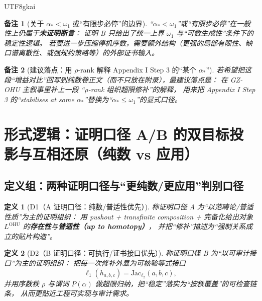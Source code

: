 \documentclass[12pt]{article}
\newtheorem{definition}{定义}[section]
\newtheorem{remark}{备注}[section]
\begin{document}
\begin{CJK*}{UTF8}{gkai}
\begin{remark}[关于 $\alpha_\ast<\omega_1$ 或“有限步必停”的边界]
“$\alpha_\ast<\omega_1$”或“有限步必停”在一般性上仍属于\textbf{未证明断言}：
证明 B 只给出了统一上界 $\omega_1$ 与“可数生成性”条件下的稳定性逻辑。
若要进一步压缩停机序数，需要额外结构（更强的局部有限性、缺口谱离散性、或强规约策略等）的外部证书输入。
\end{remark}

\begin{remark}[建议落点：用 $\rho$-rank 解释 Appendix I Step 3 的“某个 $\alpha_\ast$”]
若希望把这段“增益对比”回写到纯数卷正文（而不只放在附录），最建议落点是：
在 GZ-OHU 主叙事里补上一段 “$\rho$-rank 组织超限修补”的解释，
用来把 Appendix I Step 3 的“stabilises at some $\alpha_\ast$”替换为“$\alpha_\ast\le\omega_1$”的显式口径。
\end{remark}

\clearpage

\section{形式逻辑：证明口径 A/B 的双目标投影与互相还原（纯数 vs 应用）}
\label{sec:tex27-ch27-proof-ab-duality}

\subsection{定义组：两种证明口径与“更纯数/更应用”判别口径}
\label{subsec:tex27-ch27-defs}

\begin{definition}[D1（A 证明口径：纯数/普适性优先）]
\label{def:tex27-ch27-d1}
称证明口径 A 为“以范畴论/普适性质”为主的证明组织：
用 pushout + transfinite composition + 完备化给出对象 $L^{\mathrm{OHU}}$ 的\textbf{存在性}与\textbf{普适性（up to homotopy）}，
并把“修补”描述为“强制关系成立的贴片构造”。
\end{definition}

\begin{definition}[D2（B 证明口径：可执行/证书接口优先）]
\label{def:tex27-ch27-d2}
称证明口径 B 为“以可审计接口”为主的证明组织：
把每一次修补外显为可核验等式接口
\[
  \ell_1(h_{a,b,c})=\mathrm{Jac}_{\ell_2}(a,b,c),
\]
并用序数秩 $\rho$ 与谓词 $P(\alpha)$ 做超限归纳，把“稳定”落实为“按秩覆盖”的可检查链条，
从而更贴近工程可实现与审计需求。
\end{definition}


\end{CJK*}
\end{document}
